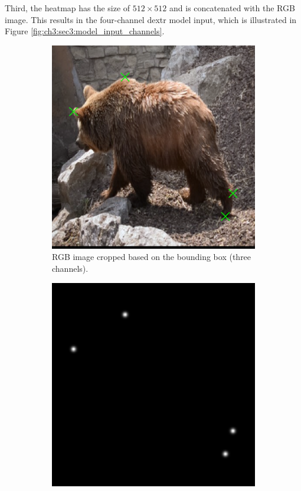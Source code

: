 Third, the heatmap has the size of $512 \times 512$  and is concatenated with the RGB image.
This results in the four-channel \gls{dextr} model input, which is illustrated in Figure \ref{fig:ch3:sec3:model_input_channels}.

\begin{figure}
	\centering
	\begin{subfigure}[b]{0.3\textwidth}
		\centering
		\includegraphics[width=\textwidth]{figures/chap33_channel_rgb.png}
		\caption{RGB image cropped based on the bounding box (three channels).}
		\label{fig:ch3:sec3:rgb_channel}
	\end{subfigure}
	\hfill
	\begin{subfigure}[b]{0.3\textwidth}
		\centering
		\includegraphics[width=\textwidth]{figures/chap33_channel_fg.png}

\end{subfigure}
\end{figure}
